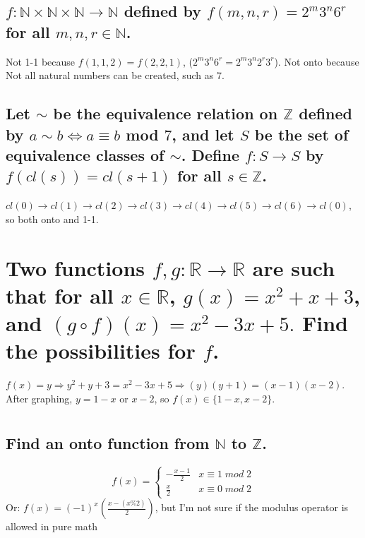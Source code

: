 \documentclass[12pt]{article}
\begin{document}
\subsection{$f: \mathds{N} \times \mathds{N} \times\mathds{N} \rightarrow \mathds{N}$ defined by $f(m,n,r) = 2^m 3^n 6^r$ for all $m,n,r \in \mathds{N}$.}
Not 1-1 because $f(1,1,2) = f(2,2,1)$, ($2^m 3^n 6^r = 2^m 3^n 2^r 3^r$). Not onto because Not all natural numbers can be created, such as 7.

\subsection{
    Let $\sim$ be the equivalence relation on $\mathds{Z}$ defined by $a \sim b \Leftrightarrow a \equiv b$ mod $7$,
    and let $S$ be the set of equivalence classes of $\sim$. Define $f: S \rightarrow S$ by $f(cl(s)) = cl(s+1)$
    for all $s \in \mathds{Z}$.
}
$cl(0) \rightarrow cl(1) \rightarrow cl(2) \rightarrow cl(3) \rightarrow cl(4) \rightarrow cl(5) \rightarrow cl(6) \rightarrow cl(0)$,
so both onto and 1-1.

\setcounter{section}{2}

\section{
    Two functions $f, g : \mathds{R} \rightarrow \mathds{R}$ are such that for all $x \in \mathds{R}$, $g(x) = x^2 + x + 3$, and
    $(g \circ f)(x) = x^2 -3x + 5.$ Find the possibilities for $f$.
}
$f(x) = y \Rightarrow y^2 + y + 3 = x^2 - 3x +5 \Rightarrow (y)(y+1) = (x-1)(x-2)$. After graphing,
$y = 1-x$ or $x-2$, so $f(x) \in \{1-x, x-2\}$.

\setcounter{section}{5}

\section{}
\subsection{Find an onto function from $\mathds{N}$ to $\mathds{Z}$.}
\[ f(x) = 
\begin{cases} 
    -\frac{x-1}{2} & x \equiv 1 \; mod \; 2\\
    \frac{x}{2} & x \equiv 0 \; mod \; 2
\end{cases}
\]
Or: $f(x) = (-1)^x (\frac{x - (x \% 2)}{2})$, but I'm not sure if the modulus operator is allowed in pure math
\end{document}

